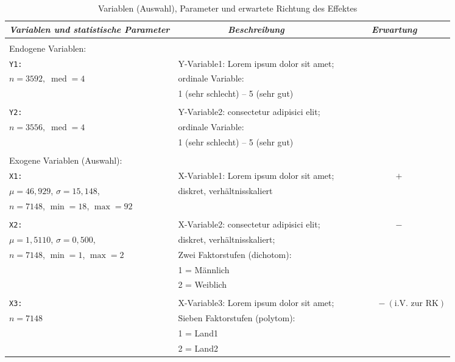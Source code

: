 \begin{table}[!htbp] \centering 
	\footnotesize 
  \caption{Variablen (Auswahl), Parameter und erwartete Richtung des Effektes} 
  \label{descriptive} 
\begin{tabularx}{\columnwidth}{XXl}
\hline\hline 
\multicolumn{1}{l}{\emph{Variablen und statistische Parameter}}  & \multicolumn{1}{c}{\emph{Beschreibung}} & \multicolumn{1}{c}{\emph{Erwartung}} \\ 
\hline \\[-1.8ex]
Endogene Variablen:\\
\hline
\hline 
\texttt{Y1:}  & Y-Variable1: Lorem ipsum dolor sit amet;  &  \\
 $n=3592, \;\operatorname{med}=4$  &ordinale Variable:&\\
 &1 (sehr schlecht) -- 5 (sehr gut)&\\
  \\
  \hline
\texttt{Y2:}  & Y-Variable2: consectetur adipisici elit;   &  \\
 $n=3556 , \;\operatorname{med}=4$ &ordinale Variable:&\\
 &1 (sehr schlecht) -- 5 (sehr gut)&\\
\\
\hline
\hline
Exogene Variablen (Auswahl):\\
\hline
\hline
\texttt{X1:}  & X-Variable1: Lorem ipsum dolor sit amet;  & $\qquad \qquad  \qquad  +$\\
$\mu=46{,}929$, $\sigma=15{,}148$, & diskret, verhältnisskaliert &\\
$n=7148$, $\operatorname{min}=18$, $\operatorname{max}=92$ &&\\
\\
\hline
\texttt{X2:}  & X-Variable2: consectetur adipisici elit;  & $\qquad \qquad  \qquad  -$ \\
$\mu=1{,}5110$, $\sigma= 0{,}500$,  & diskret, verhältnisskaliert; &\\ 
$n=7148$, $\operatorname{min}=1$, $\operatorname{max}=2$ & Zwei Faktorstufen (dichotom): &\\
& 1 = Männlich &\\
& 2 = Weiblich &\\
\\
\hline
\texttt{X3:} & X-Variable3: Lorem ipsum dolor sit amet; & $\qquad \qquad  - (\text{i.V. zur RK} )$ \\
$n=7148$ & Sieben Faktorstufen (polytom): &\\ 
& 1 = Land1 &\\
& 2 = Land2 &\\

\end{tabularx}
\end{table}
